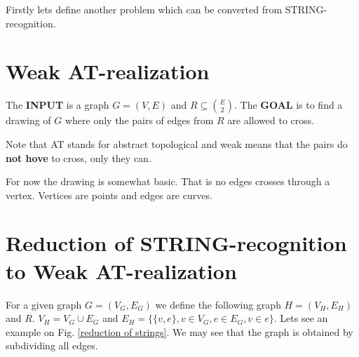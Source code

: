Firstly lets define another problem which can be converted from STRING-recognition.

\section{Weak AT-realization}

The \textbf{INPUT} is a graph $G = (V,E)$ and $R \subseteq \binom{E}{2}$. The \textbf{GOAL} is to find a drawing of $G$ where only the pairs of edges from $R$ are allowed to cross.

Note that AT stands for abstract topological and weak means that the pairs do \textbf{not hove} to cross, only they can.

For now the drawing is somewhat basic. That is no edges crosses through a vertex. Vertices are points and edges are curves.

\section{Reduction of STRING-recognition to Weak AT-realization}

For a given graph $G = (V_G,E_G)$ we define the following graph $H = (V_H, E_H)$ and $R$. $V_H = V_G \cup E_G$ and $E_H = \{\{v,e\}, v \in V_G, e \in E_G, v \in e\}$. Lets see an example on Fig. \ref{reduction of strings}. We may see that the graph is obtained by subdividing all edges.


